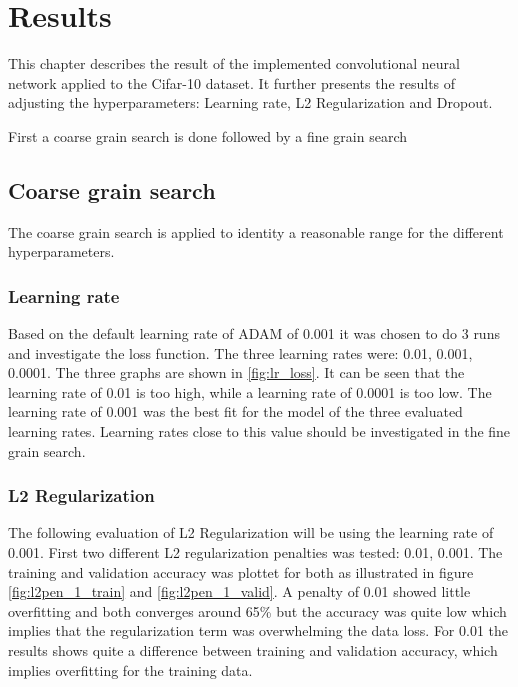 \chapter{Results}
\label{chp:res}

This chapter describes the result of the implemented convolutional neural network applied to the Cifar-10 dataset. It further presents the results of adjusting the hyperparameters: Learning rate, L2 Regularization and Dropout.

First a coarse grain search is done followed by a fine grain search

\section{Coarse grain  search}
The coarse grain search is applied to identity a reasonable range for the different hyperparameters.

\subsection{Learning rate}
Based on the default learning rate of ADAM of 0.001 it was chosen to do 3 runs and investigate the loss function. The three learning rates were: 0.01, 0.001, 0.0001. The three graphs are shown in \ref{fig:lr_loss}. It can be seen that the learning rate of 0.01 is too high, while a learning rate of 0.0001 is too low. The learning rate of 0.001 was the best fit for the model of the three evaluated learning rates. Learning rates close to this value should be investigated in the fine grain search.
	

\FloatBarrier
\subsection{L2 Regularization}
The following evaluation of L2 Regularization will be using the learning rate of 0.001. First two different L2 regularization penalties was tested: 0.01, 0.001.  The training and validation accuracy was plottet for both as illustrated in figure \ref{fig:l2pen_1_train} and \ref{fig:l2pen_1_valid}. A penalty of 0.01 showed little overfitting and both converges around 65\% but the accuracy was quite low which implies that the regularization term was overwhelming the data loss. For 0.01 the results shows quite a difference between training and validation accuracy, which implies overfitting for the training data. 

